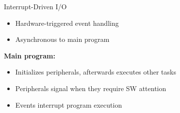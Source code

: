 \begin{concept}{Interrupt-Driven I/O}
\begin{itemize}
  \item Hardware-triggered event handling
  \item Asynchronous to main program
\end{itemize}

\textbf{Main program:}
    \begin{itemize}
      \item Initializes peripherals, afterwards executes other tasks
      \item Peripherals signal when they require SW attention
      \item Events interrupt program execution
    \end{itemize}


\end{concept}

